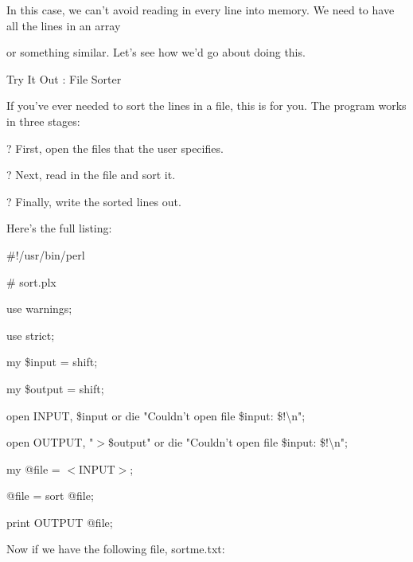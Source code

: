 \documentclass[a4paper,11pt]{book}
\begin{document}
\noindent In this case, we can't avoid reading in every line into memory. We need to have all the lines in an array

\noindent or something similar. Let's see how we'd go about doing this.

\noindent 

\noindent Try It Out : File Sorter

\noindent 

\noindent 

\noindent If you've ever needed to sort the lines in a file, this is for you. The program works in three stages:

\noindent 

\noindent ? First, open the files that the user specifies.

\noindent 

\noindent ? Next, read in the file and sort it.

\noindent 

\noindent ? Finally, write the sorted lines out.

\noindent 

\noindent Here's the full listing:

\noindent 

\noindent 

\noindent \#!/usr/bin/perl

\noindent \# sort.plx

\noindent use warnings;

\noindent use strict;

\noindent 

\noindent my \$input = shift;

\noindent my \$output = shift;

\noindent open INPUT, \$input or die "Couldn't open file \$input: \$!\textbackslash n";

\noindent open OUTPUT, "$>$\$output" or die "Couldn't open file \$input: \$!\textbackslash n";

\noindent 

\noindent my @file = $<$INPUT$>$;

\noindent @file = sort @file;

\noindent 

\noindent print OUTPUT @file;

\noindent 

\noindent Now if we have the following file, sortme.txt:

\noindent 

\noindent 
\end{document}
